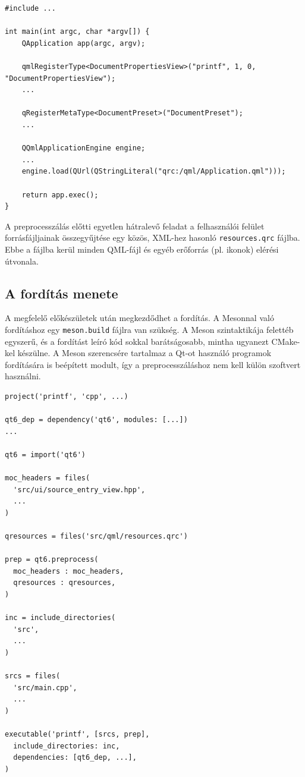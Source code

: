 \begin{listing}[!h]
    \caption{Metatípusok bejegyzése a program \texttt{main} függvényében.}
    \label{lst:qt-meta}
    \begin{verbatim}
#include ...

int main(int argc, char *argv[]) {
    QApplication app(argc, argv);

    qmlRegisterType<DocumentPropertiesView>("printf", 1, 0, "DocumentPropertiesView");
    ...
    
    qRegisterMetaType<DocumentPreset>("DocumentPreset");
    ...

    QQmlApplicationEngine engine;
    ...
    engine.load(QUrl(QStringLiteral("qrc:/qml/Application.qml")));

    return app.exec();
}
    \end{verbatim}
\end{listing}

A preprocesszálás előtti egyetlen hátralevő feladat a felhasználói felület forrásfájljainak összegyűjtése egy közös, XML-hez hasonló \texttt{resources.qrc} fájlba. Ebbe a fájlba kerül minden QML-fájl és egyéb erőforrás (pl. ikonok) elérési útvonala.

\subsection{A fordítás menete}

A megfelelő előkészületek után megkezdődhet a fordítás. A Mesonnal való fordításhoz egy \texttt{meson.build} fájlra van szükség. A Meson szintaktikája felettéb egyszerű, és a fordítást leíró kód sokkal barátságosabb, mintha ugyanezt CMake-kel készülne. A Meson szerencsére tartalmaz a Qt-ot használó programok fordítására is beépített modult, így a preprocesszáláshoz nem kell külön szoftvert használni. 


\begin{listing}[!h]
    \caption{A fordítást leíró \texttt{meson.build} fájl.}
    \label{lst:meson-build}
    \begin{verbatim}
project('printf', 'cpp', ...)

qt6_dep = dependency('qt6', modules: [...])
...

qt6 = import('qt6')

moc_headers = files(
  'src/ui/source_entry_view.hpp',
  ...
)

qresources = files('src/qml/resources.qrc')

prep = qt6.preprocess(
  moc_headers : moc_headers,
  qresources : qresources,
)

inc = include_directories(
  'src',
  ...
)

srcs = files(
  'src/main.cpp',
  ...
)

executable('printf', [srcs, prep],
  include_directories: inc,
  dependencies: [qt6_dep, ...],
)
    \end{verbatim}
\end{listing}

